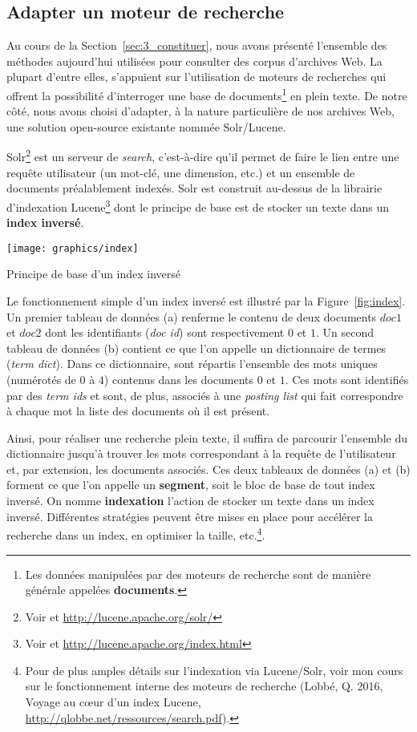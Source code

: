 \documentclass[symmetric,justified,marginals=raggedouter]{tufte-book}
\begin{document}
\subsection{Adapter un moteur de recherche}

\noindent Au cours de la Section~\ref{sec:3_constituer}, nous avons présenté l'ensemble des méthodes aujourd'hui utilisées pour consulter des corpus d'archives Web. La plupart d'entre elles, s'appuient sur l'utilisation de moteurs de recherches qui offrent la possibilité d'interroger une base de documents\footnote{\RaggedOuter Les données manipulées par des moteurs de recherche sont de manière générale appelées \textbf{documents}.} en plein texte. De notre côté, nous avons choisi d'adapter, à la nature particulière de nos archives Web, une solution open-source existante nommée Solr/Lucene. 

Solr\footnote{\RaggedOuter Voir \citep{grainger_solr_2014} et \url{http://lucene.apache.org/solr/}} est un serveur de \textit{search}, c'est-à-dire qu'il permet de faire le lien entre une requête utilisateur (un mot-clé, une dimension, etc.) et un ensemble de documents préalablement indexés. Solr est construit au-dessus de la librairie d'indexation Lucene\footnote{\RaggedOuter Voir \citep{mccandless_lucene_2010} et \url{http://lucene.apache.org/index.html}} dont le principe de base est de stocker un texte dans un \textbf{index inversé}.

\begin{marginfigure}%
  \texttt{[image: graphics/index]}
  \vspace*{0.2cm}  
  \caption{Principe de base d'un index inversé}
  \label{fig:index}
\end{marginfigure} 


Le fonctionnement simple d'un index inversé est illustré par la Figure~\ref{fig:index}. Un premier tableau de données (a) renferme le contenu de deux documents $doc 1$ et $doc 2$ dont les identifiants (\textit{doc id}) sont respectivement $0$ et $1$. Un second tableau de données (b) contient ce que l'on appelle un dictionnaire de termes (\textit{term dict}). Dans ce dictionnaire, sont répartis l'ensemble des mots uniques (numérotés de $0$ à $4$) contenus dans les documents $0$ et $1$. Ces mots sont identifiés par des \textit{term ids} et sont, de plus, associés à une \textit{posting list} qui fait correspondre à chaque mot la liste des documents où il est présent. 

Ainsi, pour réaliser une recherche plein texte, il suffira de parcourir l'ensemble du dictionnaire jusqu'à trouver les mots correspondant à la requête de l'utilisateur et, par extension, les documents associés. Ces deux tableaux de données (a) et (b) forment ce que l'on appelle un \textbf{segment}, soit le bloc de base de tout index inversé. On nomme \textbf{indexation} l'action de stocker un texte dans un index inversé. Différentes stratégies peuvent être mises en place pour accélérer la recherche dans un index, en optimiser la taille, etc.\footnote{\RaggedOuter Pour de plus amples détails sur l'indexation via Lucene/Solr, voir mon cours sur le fonctionnement interne des moteurs de recherche (Lobbé, Q. 2016, Voyage au cœur d'un index Lucene, \url{http://qlobbe.net/ressources/search.pdf}).}. 
\end{document}
